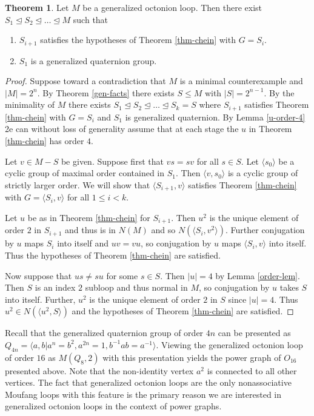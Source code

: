 \documentclass[12pt]{report}
\theoremstyle{definition}
\newtheorem{thm}{Theorem}[chapter]
\begin{document}
\begin{thm}\label{genOctChain}
  Let $M$ be a generalized octonion loop. Then there exist $S_1\unlhd S_2\unlhd\ldots\unlhd M$ such that
  \begin{enumerate}
    \item $S_{i + 1}$ satisfies the hypotheses of Theorem \ref{thm-chein} with $G = S_i$.
    \item $S_1$ is a generalized quaternion group.
  \end{enumerate}
\end{thm}

\begin{proof}
  Suppose toward a contradiction that $M$ is a minimal counterexample and $|M| = 2^n$. By Theorem
    \ref{gen-facts} there exists $S \leq M$ with $|S| = 2^{n - 1}$. By the minimality of $M$ there exists
    $S_1 \unlhd S_2\unlhd \ldots \unlhd S_k = S$ where $S_{i + 1}$ satisfies Theorem \ref{thm-chein} with
    $G = S_i$ and $S_1$ is generalized quaternion. By Lemma \ref{u-order-4} 2e can without loss of generality
    assume that at each stage the $u$ in Theorem \ref{thm-chein} has order $4$. 

  Let $v\in M - S$ be given. Suppose first that $vs = sv$ for all $s\in S$. Let $\langle s_0\rangle$ be a
    cyclic group of maximal order contained in $S_1$. Then $\langle v, s_0\rangle$ is a cyclic group of
    strictly larger order. We will show that $\langle S_{i + 1}, v\rangle$ satisfies Theorem \ref{thm-chein}
    with $G = \langle S_i, v\rangle$ for all $1\leq i < k$.

  Let $u$ be as in Theorem \ref{thm-chein} for $S_{i + 1}$. Then $u^2$ is the unique element of order $2$ in
    $S_{i + 1}$ and thus is in $N(M)$ and so $N(\langle S_i, v^2\rangle)$. Further conjugation by $u$ maps
    $S_i$ into itself and $uv = vu$, so conjugation by $u$ maps $\langle S_i, v\rangle$ into itself. Thus
    the hypotheses of Theorem \ref{thm-chein} are satisfied.

  Now suppose that $us\neq su$ for some $s\in S$. Then $|u| = 4$ by Lemma \ref{order-lem}. Then $S$ is an index $2$ subloop
    and thus normal in $M$, so conjugation by $u$ takes $S$ into itself. Further, $u^2$ is the unique element of order $2$
    in $S$ since $|u| = 4$. Thus $u^2\in N(\langle u^2, S\rangle)$ and the hypotheses of Theorem \ref{thm-chein} are
    satisfied.
\end{proof}


Recall that the generalized quaternion group of order $4n$ can be presented as
  $Q_{4n} = \langle a, b | a^n = b^2, a^{2n} = 1, b^{-1}ab = a^{-1}\rangle$. Viewing the generalized
  octonion loop of order $16$ as $M(Q_8, 2)$ with this presentation yields the power graph of $O_{16}$
  presented above. Note that the non-identity vertex $a^2$ is connected to all other vertices. The fact
  that generalized octonion loops are the only nonassociative Moufang loops with this feature is the
  primary reason we are interested in generalized octonion loops in the context of power graphs.
\end{document}
